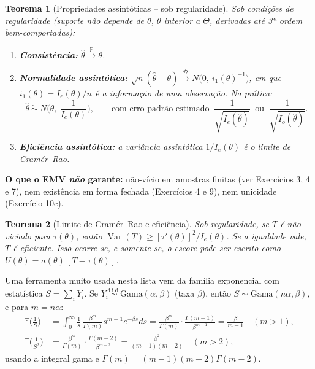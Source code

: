 \documentclass[11pt,a4paper]{article}
\newcommand{\E}{\mathbb{E}}
\newcommand{\Var}{\operatorname{Var}}
\newcommand{\Prob}{\mathbb{P}}
\newcommand{\iid}{\overset{\text{i.i.d.}}{\sim}}
\newcommand{\convP}{\xrightarrow{\;\Prob\;}}
\newcommand{\convD}{\xrightarrow{\;\mathcal D\;}}
\theoremstyle{definition}
\theoremstyle{plain}
\newtheorem{teorema}{Teorema}[section]
\begin{document}
\begin{teorema}[Propriedades assintóticas -- sob regularidade]
Sob condições de regularidade (suporte não depende de $\theta$, $\theta$ interior a $\Theta$, derivadas até 3ª ordem bem-comportadas):
\begin{enumerate}[label=(\roman*)]
\item \textbf{Consistência:} $\hat\theta\convP\theta$.
\item \textbf{Normalidade assintótica:} $\sqrt n(\hat\theta-\theta)\convD N\big(0,\ i_1(\theta)^{-1}\big)$, em que $i_1(\theta)=I_e(\theta)/n$ é a informação de uma observação. Na prática:
\[
\hat\theta\ \dot\sim\ N\Big(\theta,\ \frac{1}{I_e(\theta)}\Big),\qquad\text{com erro-padrão estimado }\ \frac{1}{\sqrt{I_e(\hat\theta)}}\ \text{ ou }\ \frac{1}{\sqrt{I_o(\hat\theta)}} .
\]
\item \textbf{Eficiência assintótica:} a variância assintótica $1/I_e(\theta)$ é o limite de Cramér--Rao.
\end{enumerate}
\end{teorema}

\begin{mdframed}[linecolor=BrickRed,backgroundcolor=BrickRed!3]
\textbf{O que o EMV \emph{não} garante:} não-vício em amostras finitas (ver Exercícios 3, 4 e 7), nem existência em forma fechada (Exercícios 4 e 9), nem unicidade (Exercício 10c).
\end{mdframed}

\begin{teorema}[Limite de Cramér--Rao e eficiência]
Sob regularidade, se $T$ é não-viciado para $\tau(\theta)$, então $\Var(T)\ge[\tau'(\theta)]^2/I_e(\theta)$. Se a igualdade vale, $T$ é \emph{eficiente}. Isso ocorre se, e somente se, o escore pode ser escrito como $U(\theta)=a(\theta)\,[T-\tau(\theta)]$.
\end{teorema}

Uma ferramenta muito usada nesta lista vem da família exponencial com estatística $S=\sum_iY_i$. Se $Y_i\iid\text{Gama}(\alpha,\beta)$ (taxa $\beta$), então $S\sim\text{Gama}(n\alpha,\beta)$, e para $m=n\alpha$:
\begin{align*}
\E\Big(\frac1S\Big)&=\int_0^\infty\frac1s\,\frac{\beta^m}{\Gamma(m)}s^{m-1}e^{-\beta s}ds=\frac{\beta^m}{\Gamma(m)}\cdot\frac{\Gamma(m-1)}{\beta^{m-1}}=\frac{\beta}{m-1}\quad(m>1),\\
\E\Big(\frac1{S^2}\Big)&=\frac{\beta^m}{\Gamma(m)}\cdot\frac{\Gamma(m-2)}{\beta^{m-2}}=\frac{\beta^2}{(m-1)(m-2)}\quad(m>2),
\end{align*}
usando a integral gama e $\Gamma(m)=(m-1)(m-2)\Gamma(m-2)$.
\end{document}
